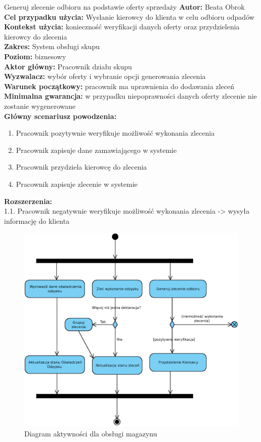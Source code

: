 	\begin{usecase}{Generuj zlecenie odbioru na podstawie oferty sprzedaży}
		\textbf{Autor:} Beata Obrok \\
		\textbf{Cel przypadku użycia:} Wysłanie kierowcy do klienta w celu odbioru odpadów \\
		\textbf{Kontekst użycia:} konieczność weryfikacji danych oferty oraz przydzielenia kierowcy do zlecenia \\
		\textbf{Zakres:} System obsługi skupu \\
		\textbf{Poziom:} biznesowy \\
		\textbf{Aktor główny:} Pracownik działu skupu\\
		\textbf{Wyzwalacz:} wybór oferty i wybranie opcji generowania zlecenia \\
		\textbf{Warunek początkowy:} pracownik ma uprawnienia do dodawania zleceń \\
		\textbf{Minimalna gwarancja:} w przypadku niepoprawności danych oferty zlecenie nie zostanie wygenerowane \\
		\textbf{Główny scenariusz powodzenia:} \\
			\begin{enumerate}
				\item Pracownik pozytywnie weryfikuje możliwość wykonania zlecenia
				\item Pracownik zapisuje dane zamawiającego w systemie
				\item Pracownik przydziela kierowcę do zlecenia
				\item Pracownik zapisuje zlecenie w systemie
			\end{enumerate}
		\textbf{Rozszerzenia:} \\
				1.1. Pracownik negatywnie weryfikuje możliwość wykonania zlecenia -> wysyła informację do klienta
	\end{usecase}

	\begin{figure}[H]
		\centering
		\includegraphics[width=.9\textwidth]{img/AD/skup.eps}
		\caption{Diagram aktywności dla obsługi magazynu}
	\end{figure}

